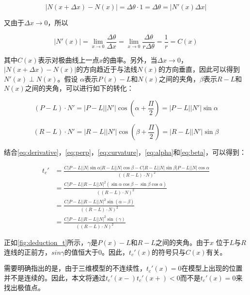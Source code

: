 \begin{equation}
    |N(x+\Delta x) - N(x)| = \Delta\theta \cdot 1 = \Delta\theta = |N'(x)\Delta x|
\end{equation}

又由于$\Delta x \to 0$，所以

\begin{equation}\label{eq:curvature}
    |N'(x)| = \lim_{x \to 0}\frac{\Delta\theta}{\Delta x} = \lim_{x \to 0}\frac{\Delta\theta}{r\Delta\theta} = \frac{1}{r} = C(x)
\end{equation}

其中$C(x)$表示对极曲线上一点$x$的曲率。另外，当$\Delta x \to 0$，$|N(x+\Delta x) - N(x)|$的方向趋近于与法线$N(x)$的方向垂直，因此可以得到$N'(x) \perp N(x)$。假设 $\alpha$表示$P(x)-L$和$N(x)$之间的夹角，$\beta$表示$R-L$和$N(x)$之间的夹角，可以进行如下的转化：

\begin{equation}\label{eq:alpha}
(P-L)\cdot{N'} = |P-L|{|N'|}\cos{(\alpha+\frac{\Pi}{2})} = |P-L|{|N'|}\sin\alpha
\end{equation}

\begin{equation}\label{eq:beta}
(R-L)\cdot{N'} = |R-L|{|N'|}\cos{(\beta+\frac{\Pi}{2})} = |R-L|{|N'|}\sin\beta
\end{equation}

结合\autoref{eq:derivative}，\autoref{eq:perp}，\autoref{eq:curvature}，\autoref{eq:alpha}和\ref{eq:beta}，可以得到：

\begin{equation}\label{eq:final}
\begin{split}
t_c' & = \frac{C|P-L||N|\sin\alpha|R-L||N|\cos\beta-C|R-L||N|\sin\beta|P-L||N|\cos\alpha}{((R-L)\cdot{N})^2} \\
& = \frac{C|P-L||R-L||N|^2(\sin\alpha\cos\beta-\sin\beta\cos\alpha)}{((R-L)\cdot{N})^2} \\
& = \frac{C|P-L||R-L||N|^2\sin(\alpha-\beta)}{((R-L)\cdot{N})^2} \\
& = \frac{C|P-L||R-L||N|^2\sin(\gamma)}{((R-L)\cdot{N})^2}
\end{split}
\end{equation}

正如\autoref{fig:deduction_t}所示，$\gamma$是$P(x)-L$和$R-L$之间的夹角。由于$x$ 位于$L$与$R$连线的正前方，$sin\gamma$的值恒大于0。因此，$t_c'(x)$的符号只与$C(x)$有关。

需要明确指出的是，由于三维模型的不连续性，$t_c'(x)=0$在模型上出现的位置并不是连续的。因此，本文将通过$t_c'(x-)t_c'(x+) < 0$而不是$t_c'(x)=0$来找出极值点。

